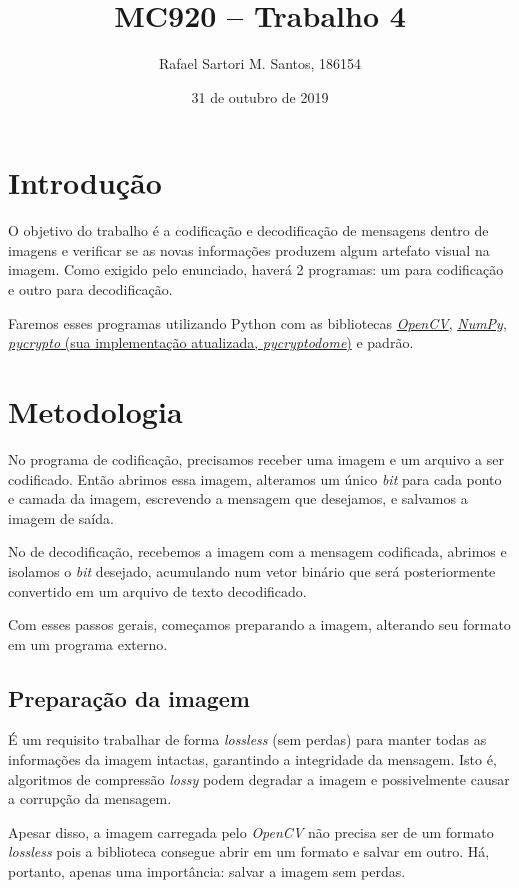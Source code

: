 \documentclass[brazilian,a4paper,twocolumn]{article}
\title{MC920 -- Trabalho 4}
\author{Rafael Sartori M. Santos, 186154}
\date{31 de outubro de 2019}
\begin{document}
\maketitle


\section{Introdução}

    O objetivo do trabalho é a codificação e decodificação de mensagens dentro de imagens e verificar se as novas informações produzem algum artefato visual na imagem. Como exigido pelo enunciado, haverá 2 programas: um para codificação e outro para decodificação.

    Faremos esses programas utilizando Python com as bibliotecas \href{https://opencv.org/}{\emph{OpenCV}}, \href{https://numpy.org/}{\emph{NumPy}}, \href{https://www.pycryptodome.org/}{\emph{pycrypto} (sua implementação atualizada, \emph{pycryptodome})} e padrão.


\section{Metodologia}

    No programa de codificação, precisamos receber uma imagem e um arquivo a ser codificado. Então abrimos essa imagem, alteramos um único \textit{bit} para cada ponto e camada da imagem, escrevendo a mensagem que desejamos, e salvamos a imagem de saída.

    No de decodificação, recebemos a imagem com a mensagem codificada, abrimos e isolamos o \textit{bit} desejado, acumulando num vetor binário que será posteriormente convertido em um arquivo de texto decodificado.

    Com esses passos gerais, começamos preparando a imagem, alterando seu formato em um programa externo.

    \subsection{Preparação da imagem}

        É um requisito trabalhar de forma \textit{lossless} (sem perdas) para manter todas as informações da imagem intactas, garantindo a integridade da mensagem. Isto é, algoritmos de compressão \textit{lossy} podem degradar a imagem e possivelmente causar a corrupção da mensagem.

        Apesar disso, a imagem carregada pelo \emph{OpenCV} não precisa ser de um formato \textit{lossless} pois a biblioteca consegue abrir em um formato e salvar em outro. Há, portanto, apenas uma importância: salvar a imagem sem perdas.
\end{document}
